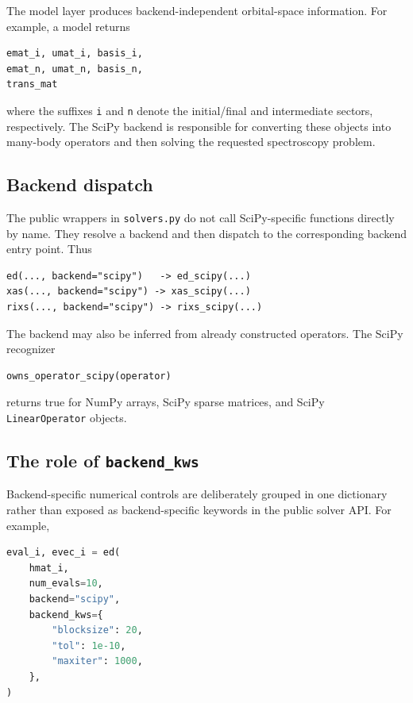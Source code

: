 \documentclass[11pt]{article}
\begin{document}
The model layer produces backend-independent orbital-space information.  For example, a model returns

\begin{lstlisting}
emat_i, umat_i, basis_i,
emat_n, umat_n, basis_n,
trans_mat
\end{lstlisting}

where the suffixes \texttt{i} and \texttt{n} denote the initial/final and intermediate sectors, respectively.  The SciPy backend is responsible for converting these objects into many-body operators and then solving the requested spectroscopy problem.

\subsection{Backend dispatch}

The public wrappers in \texttt{solvers.py} do not call SciPy-specific functions directly by name.  They resolve a backend and then dispatch to the corresponding backend entry point.  Thus

\begin{lstlisting}
ed(..., backend="scipy")   -> ed_scipy(...)
xas(..., backend="scipy") -> xas_scipy(...)
rixs(..., backend="scipy") -> rixs_scipy(...)
\end{lstlisting}

The backend may also be inferred from already constructed operators.  The SciPy recognizer

\begin{lstlisting}
owns_operator_scipy(operator)
\end{lstlisting}

returns true for NumPy arrays, SciPy sparse matrices, and SciPy \texttt{LinearOperator} objects.

\subsection{The role of \texttt{backend\_kws}}

Backend-specific numerical controls are deliberately grouped in one dictionary rather than exposed as backend-specific keywords in the public solver API.  For example,

\begin{lstlisting}[language=Python]
eval_i, evec_i = ed(
    hmat_i,
    num_evals=10,
    backend="scipy",
    backend_kws={
        "blocksize": 20,
        "tol": 1e-10,
        "maxiter": 1000,
    },
)
\end{lstlisting}
\end{document}
